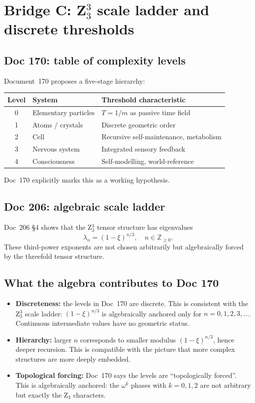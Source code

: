 \section{\texorpdfstring{Bridge C: Z$_3^3$ scale ladder and discrete thresholds}{Bridge C: Z3-cubed scale ladder and discrete thresholds}}\label{sec:bridgeC}

\subsection{Doc 170: table of complexity levels}

Document~170 proposes a five-stage hierarchy:

\begin{center}
\begin{tabular}{c|l|l}
\textbf{Level} & \textbf{System} & \textbf{Threshold characteristic} \\
\hline
0 & Elementary particles & $T = 1/m$ as passive time field \\
1 & Atoms / crystals & Discrete geometric order \\
2 & Cell & Recursive self-maintenance, metabolism \\
3 & Nervous system & Integrated sensory feedback \\
4 & Consciousness & Self-modelling, world-reference \\
\end{tabular}
\end{center}

Doc~170 explicitly marks this as a working hypothesis.

\subsection{Doc 206: algebraic scale ladder}

Doc~206 \S4 shows that the Z$_3^3$ tensor structure has eigenvalues
\[
\lambda_n = (1-\xi)^{n/3}, \quad n \in \mathbb{Z}_{\geq 0}.
\]
These third-power exponents are not chosen arbitrarily but algebraically forced by the threefold tensor structure.

\subsection{What the algebra contributes to Doc 170}

\begin{itemize}
\item \textbf{Discreteness:} the levels in Doc~170 are discrete. This is consistent with the Z$_3^3$ scale ladder: $(1-\xi)^{n/3}$ is algebraically anchored only for $n = 0, 1, 2, 3, \dots$. Continuous intermediate values have no geometric status.
\item \textbf{Hierarchy:} larger $n$ corresponds to smaller modulus $(1-\xi)^{n/3}$, hence deeper recursion. This is compatible with the picture that more complex structures are more deeply embedded.
\item \textbf{Topological forcing:} Doc~170 says the levels are ``topologically forced''. This is algebraically anchored: the $\omega^k$ phases with $k = 0, 1, 2$ are not arbitrary but exactly the Z$_3$ characters.
\end{itemize}

